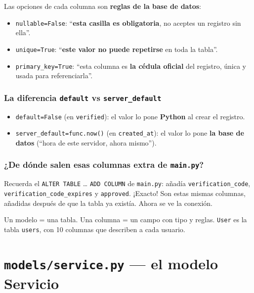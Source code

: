 \documentclass[11pt,a4paper]{article}
\begin{document}
Las opciones de cada columna son \textbf{reglas de la base de datos}:

\begin{itemize}
    \item \texttt{nullable=False}: ``\textbf{esta casilla es obligatoria}, no aceptes un registro sin ella''.
    \item \texttt{unique=True}: ``\textbf{este valor no puede repetirse} en toda la tabla''.
    \item \texttt{primary\_key=True}: ``esta columna es \textbf{la cédula oficial} del registro, única y usada para referenciarla''.
\end{itemize}

\subsubsection{La diferencia \texttt{default} vs \texttt{server\_default}}

\begin{itemize}
    \item \texttt{default=False} (en \texttt{verified}): el valor lo pone \textbf{Python} al crear el registro.
    \item \texttt{server\_default=func.now()} (en \texttt{created\_at}): el valor lo pone \textbf{la base de datos} (``hora de este servidor, ahora mismo'').
\end{itemize}

\subsubsection{¿De dónde salen esas columnas extra de \texttt{main.py}?}

Recuerda el \texttt{ALTER TABLE} \ldots{} \texttt{ADD COLUMN} de \texttt{main.py}: añadía
\texttt{verification\_code}, \texttt{verification\_code\_}\allowbreak\texttt{expires} y \texttt{approved}.
¡Exacto! Son estas mismas columnas, añadidas después de que la tabla ya existía. Ahora se ve la conexión.

\begin{recuadro}
Un modelo = una tabla. Una columna = un campo con tipo y reglas.
\texttt{User} es la tabla \texttt{users}, con 10 columnas que describen a cada usuario.
\end{recuadro}

\section{\texttt{models/service.py} --- el modelo Servicio}
\end{document}
